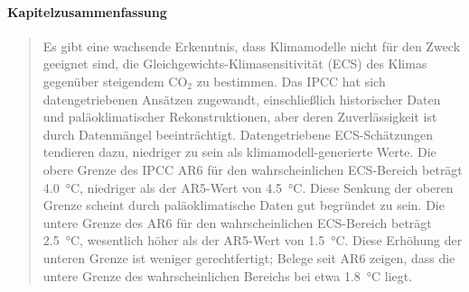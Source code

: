 \documentclass[12pt,paper=a4,DIV=12,parskip=never,chapterprefix=false,headings=standardclasses]{scrreprt}
\numberwithin{figure}{chapter}
\begin{document}
\paragraph{Kapitelzusammenfassung}
\begin{quote}
Es gibt eine wachsende Erkenntnis, dass Klimamodelle nicht für den Zweck geeignet sind, die Gleichgewichts-Klimasensitivität (ECS) des Klimas gegenüber steigendem CO$_2$ zu bestimmen. Das IPCC hat sich datengetriebenen Ansätzen zugewandt, einschließlich historischer Daten und paläoklimatischer Rekonstruktionen, aber deren Zuverlässigkeit ist durch Datenmängel beeinträchtigt.
Datengetriebene ECS-Schätzungen tendieren dazu, niedriger zu sein als klimamodell-generierte Werte. Die obere Grenze des IPCC AR6 für den wahrscheinlichen ECS-Bereich beträgt \SI{4.0}{\celsius}, niedriger als der AR5-Wert von \SI{4.5}{\celsius}. Diese Senkung der oberen Grenze scheint durch paläoklimatische Daten gut begründet zu sein. Die untere Grenze des AR6 für den wahrscheinlichen ECS-Bereich beträgt \SI{2.5}{\celsius}, wesentlich höher als der AR5-Wert von \SI{1.5}{\celsius}. Diese Erhöhung der unteren Grenze ist weniger gerechtfertigt; Belege seit AR6 zeigen, dass die untere Grenze des wahrscheinlichen Bereichs bei etwa \SI{1.8}{\celsius} liegt.
\end{quote}
\end{document}
